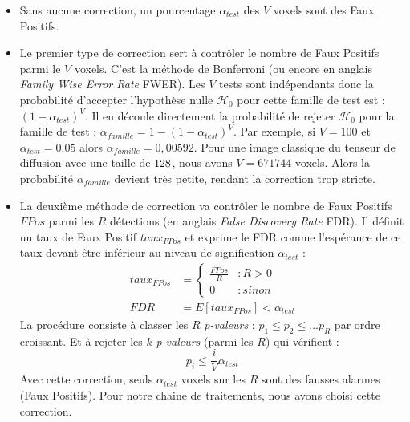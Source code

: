 \begin{itemize}
    \item Sans aucune correction, un pourcentage $\alpha_{test}$ des $V$ voxels sont des Faux Positifs.\\
    
    \item Le premier type de correction sert à contrôler le nombre de Faux Positifs parmi le $V$ voxels.
    C'est la méthode de Bonferroni \cite{Abdi2007} (ou encore en anglais \textit{Family Wise Error Rate} FWER).
    Les $V$ tests sont indépendants donc la probabilité d'accepter l'hypothèse nulle $\mathcal{H}_0$ pour cette famille de test est : $(1-\alpha_{test})^V$.
    Il en découle directement la probabilité de rejeter $\mathcal{H}_0$ pour la famille de test : $\alpha_{famille} = 1 - (1-\alpha_{test})^V$.
    Par exemple, si $V=100$ et $\alpha_{test} =0.05$ alors $\alpha_{famille}=0,00592$.
    Pour une image classique du tenseur de diffusion avec une taille de $128\time128\time41$, nous avons $V=671744$ voxels.
    Alors la probabilité $\alpha_{famille}$ devient très petite, rendant la correction trop stricte.\\
    
    \item La deuxième méthode de correction va contrôler le nombre de Faux Positifs $FPos$ parmi les $R$ détections \cite{Benjamini1995, Benjamini2001}
    (en anglais \textit{False Discovery Rate} FDR).
    Il définit un taux de Faux Positif $taux_{FPos}$ et exprime le FDR comme l'espérance de ce taux devant être inférieur au niveau de signification $\alpha_{test}$ :
    \begin{align}
        taux_{FPos} &= \left\{ \begin{array}{lr} \frac{FPos}{R} & : R > 0\\ 0 & : sinon \end{array} \right.\\
        FDR &= E\left[taux_{FPos} \right] < \alpha_{test}
    \end{align}
    La procédure consiste à classer les $R$ \textit{p-valeurs} : $p_1 \leq p_2 \leq \dots p_R$ par ordre croissant.
    Et à rejeter les $k$ \textit{p-valeurs} (parmi les $R$) qui vérifient :
    \begin{equation}
        p_i \leq \frac{i}{V}\alpha_{test} 
    \end{equation}
    Avec cette correction, seuls $\alpha_{test}$ voxels sur les $R$ sont des fausses alarmes (Faux Positifs).
    Pour notre chaine de traitements, nous avons choisi cette correction.
\end{itemize}


